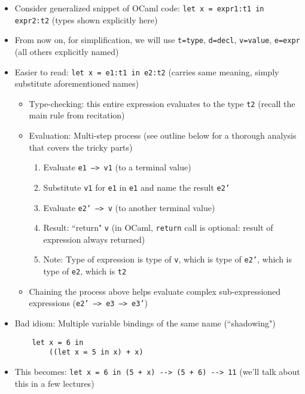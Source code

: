 \begin{itemize}
    \item Consider generalized snippet of \textsf{OCaml} code: \lstinline{let x = expr1:t1 in expr2:t2} (types shown explicitly here)
    \item From now on, for simplification, we will use \texttt{t=type}, \texttt{d=decl}, \texttt{v=value}, \texttt{e=expr} (all others explicitly named)
    \item Easier to read: \lstinline{let x = e1:t1 in e2:t2} (carries same meaning, simply substitute aforementioned names)
    \begin{itemize}
        \item Type-checking: this entire expression evaluates to the type \texttt{t2} (recall the main rule from recitation)
        \item Evaluation: Multi-step process (see outline below for a thorough analysis that covers the tricky parts)
        \begin{enumerate}
            \item Evaluate \texttt{e1 --> v1} (to a terminal value)
            \item Substitute \texttt{v1} for \texttt{e1} in \texttt{e1} and name the result \texttt{e2'}
            \item Evaluate \texttt{e2' --> v} (to another terminal value)
            \item Result: ``return" \texttt{v} (in \textsf{OCaml}, \texttt{return} call is optional: result of expression always returned)
            \item Note: Type of expression is type of \texttt{v}, which is type of \texttt{e2'}, which is type of \texttt{e2}, which is \texttt{t2}
        \end{enumerate}
        \item Chaining the process above helps evaluate complex sub-expressioned expressions (\texttt{e2' --> e3 --> e3'})
    \end{itemize}
    \item Bad idiom: Multiple variable bindings of the same name (``shadowing")
    \begin{lstlisting}
    let x = 6 in
        ((let x = 5 in x) + x) 
    \end{lstlisting}
    \item This becomes: \lstinline{let x = 6 in (5 + x) --> (5 + 6) --> 11} (we'll talk about this in a few lectures)
\end{itemize}
